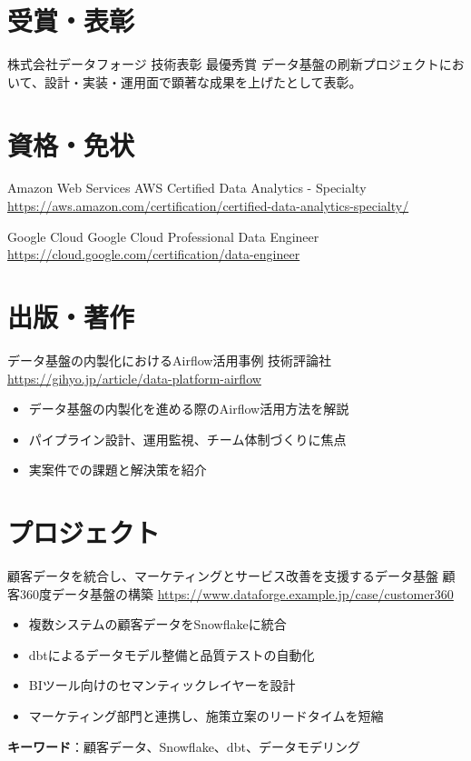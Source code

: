 \documentclass[a4paper, serif, 10pt]{moderncv}
\begin{document}
\section{受賞・表彰}

        {株式会社データフォージ}
        {技術表彰 最優秀賞}
        {}
        {}
        {データ基盤の刷新プロジェクトにおいて、設計・実装・運用面で顕著な成果を上げたとして表彰。}
\section{資格・免状}

        {Amazon Web Services}
        {AWS Certified Data Analytics - Specialty}
        {\url{https://aws.amazon.com/certification/certified-data-analytics-specialty/}}
        {}
        {}

        {Google Cloud}
        {Google Cloud Professional Data Engineer}
        {\url{https://cloud.google.com/certification/data-engineer}}
        {}
        {}
\section{出版・著作}

        {データ基盤の内製化におけるAirflow活用事例}
        {技術評論社}
        {\url{https://gihyo.jp/article/data-platform-airflow}}
        {}
        {\begin{itemize}
\item データ基盤の内製化を進める際のAirflow活用方法を解説
\item パイプライン設計、運用監視、チーム体制づくりに焦点
\item 実案件での課題と解決策を紹介
\end{itemize}}
\section{プロジェクト}

        {顧客データを統合し、マーケティングとサービス改善を支援するデータ基盤}
        {顧客360度データ基盤の構築}
        {\url{https://www.dataforge.example.jp/case/customer360}}
        {}
        {\begin{itemize}
\item 複数システムの顧客データをSnowflakeに統合
\item dbtによるデータモデル整備と品質テストの自動化
\item BIツール向けのセマンティックレイヤーを設計
\item マーケティング部門と連携し、施策立案のリードタイムを短縮
\end{itemize}
\textbf{キーワード}：顧客データ、Snowflake、dbt、データモデリング}
\end{document}
